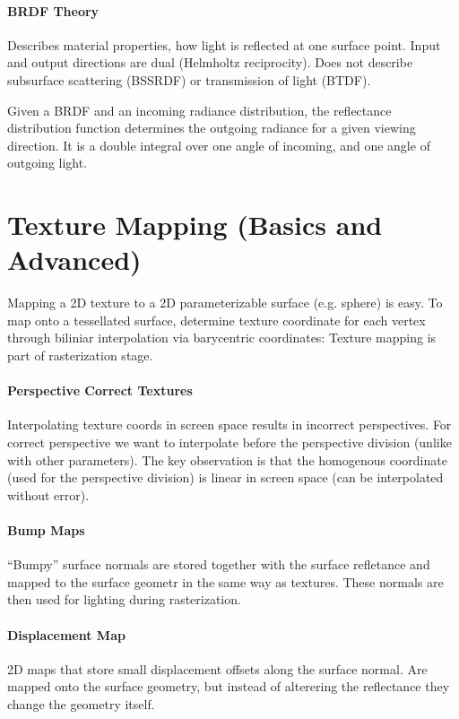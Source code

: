 \documentclass{article}
\begin{document}
\paragraph{BRDF Theory} Describes material properties, how light is reflected at one surface point. Input and output directions are dual (Helmholtz reciprocity). Does not describe subsurface scattering (BSSRDF) or transmission of light (BTDF).

Given a BRDF and an incoming radiance distribution, the reflectance distribution function determines the outgoing radiance for a given viewing direction. It is a double integral over one angle of incoming, and one angle of outgoing light.

\section{Texture Mapping (Basics and Advanced)}

Mapping a 2D texture to a 2D parameterizable surface (e.g. sphere) is easy. To map onto a tessellated surface, determine texture coordinate for each vertex through biliniar interpolation via barycentric coordinates: Texture mapping is part of rasterization stage.

\paragraph{Perspective Correct Textures} Interpolating texture coords in screen space results in incorrect perspectives. For correct perspective we want to interpolate before the perspective division (unlike with other parameters). The key observation is that the homogenous coordinate (used for the perspective division) is linear in screen space (can be interpolated without error).

\paragraph{Bump Maps} \enquote{Bumpy} surface normals are stored together with the surface refletance and mapped to the surface geometr in the same way as textures. These normals are then used for lighting during rasterization.

\paragraph{Displacement Map} 2D maps that store small displacement offsets along the surface normal. Are mapped onto the surface geometry, but instead of alterering the reflectance they change the geometry itself.
\end{document}
